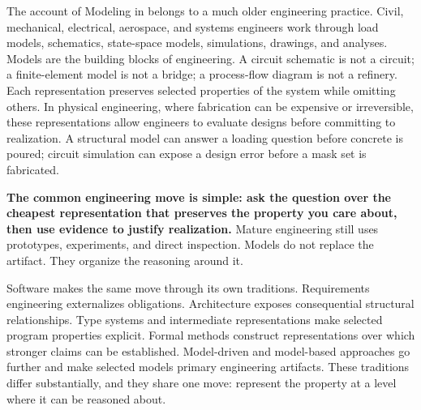 
The account of Modeling in  belongs to a much older engineering practice. Civil, mechanical, electrical, aerospace, and systems engineers work through load models, schematics, state-space models, simulations, drawings, and analyses. Models are the building blocks of engineering. A circuit schematic is not a circuit; a finite-element model is not a bridge; a process-flow diagram is not a refinery. Each representation preserves selected properties of the system while omitting others. In physical engineering, where fabrication can be expensive or irreversible, these representations allow engineers to evaluate designs before committing to realization. A structural model can answer a loading question before concrete is poured; circuit simulation can expose a design error before a mask set is fabricated.

\textbf{The common engineering move is simple: ask the question over the cheapest representation that preserves the property you care about, then use evidence to justify realization.} Mature engineering still uses prototypes, experiments, and direct inspection. Models do not replace the artifact. They organize the reasoning around it.


Software makes the same move through its own traditions. Requirements engineering externalizes obligations. Architecture exposes consequential structural relationships. Type systems and intermediate representations make selected program properties explicit. Formal methods construct representations over which stronger claims can be established. Model-driven and model-based approaches go further and make selected models primary engineering artifacts. These traditions differ substantially, and they share one move: represent the property at a level where it can be reasoned about.

